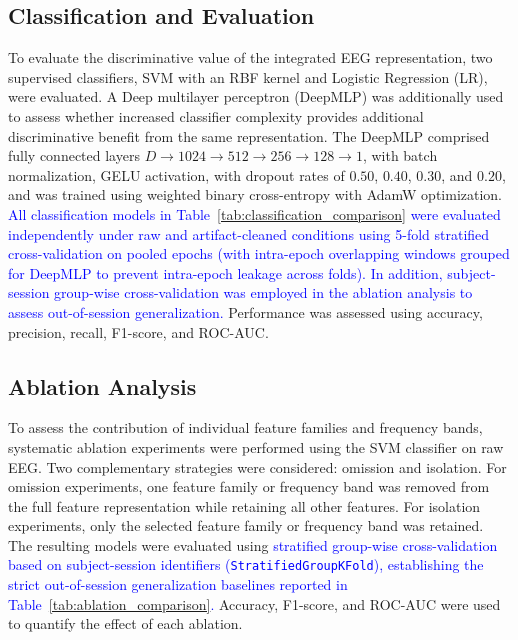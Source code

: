 \documentclass[conference]{IEEEtran}
\begin{document}
\subsection{Classification and Evaluation}
To evaluate the discriminative value of the integrated EEG representation, two supervised classifiers, SVM with an RBF kernel and Logistic Regression (LR), were evaluated. A Deep multilayer perceptron (DeepMLP) was additionally used to assess whether increased classifier complexity provides additional discriminative benefit from the same representation. The
DeepMLP comprised fully connected layers $D\rightarrow1024\rightarrow512\rightarrow256\rightarrow128\rightarrow1$, with batch normalization, GELU
activation\cite{hendrycks2016gaussian},
with dropout rates of $0.50$, $0.40$, $0.30$, and $0.20$, and was trained using weighted binary cross-entropy
with AdamW \cite{loshchilov2017decoupled} optimization. 
\textcolor{blue}{All classification models in Table~\ref{tab:classification_comparison} were evaluated independently under raw and artifact-cleaned conditions using 5-fold stratified cross-validation on pooled epochs (with intra-epoch overlapping windows grouped for DeepMLP to prevent intra-epoch leakage across folds). In addition, subject-session group-wise cross-validation was employed in the ablation analysis to assess out-of-session generalization.} Performance was assessed
using accuracy, precision, recall, F1-score, and ROC-AUC.

\subsection{Ablation Analysis}
To assess the contribution of individual feature families and frequency bands,
systematic ablation experiments were performed using the SVM classifier on raw
EEG. Two complementary strategies were considered: omission and isolation.
For omission experiments, one feature family or frequency band was removed
from the full feature representation while retaining all other features. For
isolation experiments, only the selected feature family or frequency band was
retained. The resulting models were evaluated using \textcolor{blue}{stratified group-wise cross-validation based on subject-session identifiers (\texttt{StratifiedGroupKFold}), establishing the strict out-of-session generalization baselines reported in Table~\ref{tab:ablation_comparison}.} Accuracy, F1-score,
and ROC-AUC were used to quantify the effect of each ablation.
\end{document}
